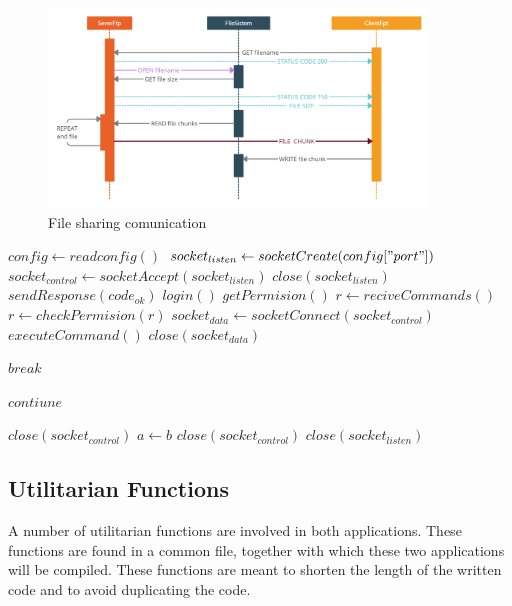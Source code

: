 \documentclass[runningheads]{llncs}
\begin{document}
    \begin{figure}
        \centering
        \includegraphics[width=0.9\textwidth,height=\textheight,keepaspectratio]{filesharing}
        \caption{File sharing comunication}
    \end{figure}

    \begin{algorithmic}[1]
        \State $config \gets readconfig()$
        \State $socket_{listen} \gets socketCreate(config["port"])$
            \State $socket_{control} \gets socketAccept(socket_{listen})$
                \State $close(socket_{listen})$
                \State $sendResponse(code_{ok})$
                \State $login()$
                \State $getPermision()$
                    \State $r \gets reciveCommands()$
                    \State $r \gets checkPermision(r)$
                        \State $socket_{data} \gets socketConnect(socket_{control})$
                        \State $executeCommand()$
                        \State $close(socket_{data})$
                    \EndIf
                    
                        \State $break$
                    \EndIf
                    
                        \State $contiune$
                    \EndIf
                    
                \EndWhile
                \State $close(socket_{control})$
            \State $a\gets b$
            \EndIf
            \State $close(socket_{control})$
        \EndWhile
        \State $close(socket_{listen})$
    \end{algorithmic}
    
    \subsection{Utilitarian Functions}
        A number of utilitarian functions are involved in both applications. These functions are found in a common file, together with which these two applications will be compiled. These functions are meant to shorten the length of the written code and to avoid duplicating the code.
\end{document}
